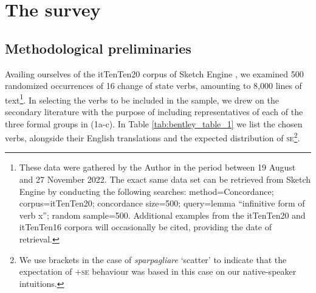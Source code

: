 \documentclass[output=paper,colorlinks,citecolor=brown
]{langscibook}
\begin{document}
\section{The survey}
\label{bentley_section_3}
\subsection{Methodological preliminaries}
\label{bentley_section_3.1}
Availing ourselves of the itTenTen20 corpus of Sketch Engine \citep{jakubicek2013tenten}, we examined 500 randomized occurrences of 16 change of state verbs, amounting to 8,000 lines of text\footnote{These data were gathered by the Author in the period between 19 August and 27 November 2022. The exact same data set can be retrieved from Sketch Engine by conducting the following searches: method=Concordance; corpus=itTenTen20; concordance size=500; query=lemma “infinitive form of verb x”; random sample=500. Additional examples from the itTenTen20 and itTenTen16 corpora \citep{jakubicek2013tenten} will occasionally be cited, providing the date of retrieval.}.  In selecting the verbs to be included in the sample, we drew on the secondary literature \citep{folli2005consuming,cennamo2012aspectual,cennamo2021anticausatives,cennamo2011anticausative,alexiadou2015external,bentley2023internally} with the purpose of including representatives of each of the three formal groups in (1a-c). In Table \ref{tab:bentley_table_1} we list the chosen verbs, alongside their English translations and the expected distribution of \textsc{se}\footnote{We use brackets in the case of \textit{sparpagliare} ‘scatter’ to indicate that the expectation of +\textsc{se} behaviour was based in this case on our native-speaker intuitions.}. 
\end{document}
